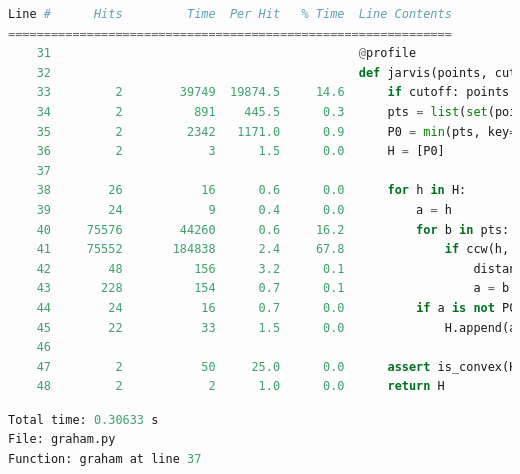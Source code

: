\documentclass[11pt,a4paper]{article}
\begin{document}
\begin{landscape}
\begin{lstlisting}[language=Python]
Line #      Hits         Time  Per Hit   % Time  Line Contents
==============================================================
    31                                           @profile
    32                                           def jarvis(points, cutoff=False):
    33         2        39749  19874.5     14.6      if cutoff: points = interior_elimination(points)
    34         2          891    445.5      0.3      pts = list(set(points))
    35         2         2342   1171.0      0.9      P0 = min(pts, key=lambda p: (p[1], p[0]))
    36         2            3      1.5      0.0      H = [P0]
    37                                               
    38        26           16      0.6      0.0      for h in H:
    39        24            9      0.4      0.0          a = h 
    40     75576        44260      0.6     16.2          for b in pts:
    41     75552       184838      2.4     67.8              if ccw(h, a, b) < 0 or (ccw(h, a, b) == 0 and \
    42        48          156      3.2      0.1                  distance(h, b) > distance(h, a)):
    43       228          154      0.7      0.1                  a = b
    44        24           16      0.7      0.0          if a is not P0:
    45        22           33      1.5      0.0              H.append(a)
    46                                           
    47         2           50     25.0      0.0      assert is_convex(H)
    48         2            2      1.0      0.0      return H
\end{lstlisting}

\clearpage

\begin{lstlisting}[language=Python]
Total time: 0.30633 s
File: graham.py
Function: graham at line 37


\end{lstlisting}
\end{landscape}
\end{document}
